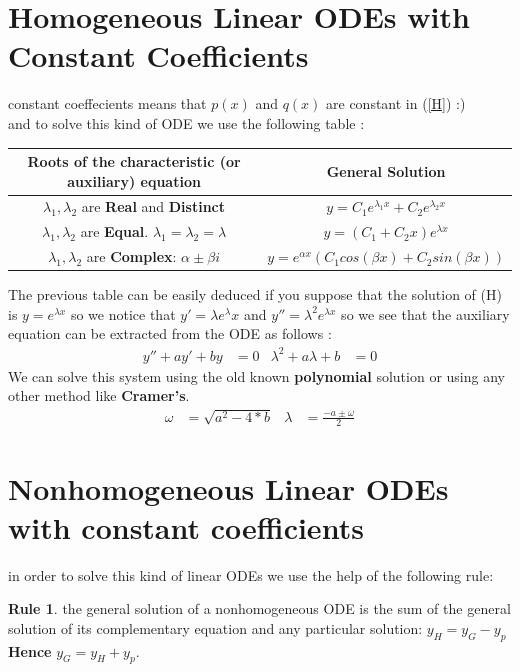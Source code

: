 \documentclass[11pt]{article}
\theoremstyle{definition}
\newtheorem{reg}{Rule}
\begin{document}
\section{Homogeneous Linear ODEs with Constant Coefficients}
constant coeffecients means that $p(x)$ and $q(x)$ are constant in (\ref{H}) :) \\
and to solve this kind of ODE we use the following table :
\begin{center}
    \begin{tabular}{c|c}
       Roots of the \textbf{characteristic (or auxiliary)} equation   & General Solution \\
       \hline
        $\lambda_1, \lambda_2$ are \textbf{Real} and \textbf{Distinct}  & $y = C_1 e^{\lambda_1 x} + C_2 e^{\lambda_2 x}$\\
        \hline
        $\lambda_1, \lambda_2$ are \textbf{Equal}. $\lambda_1 = \lambda_2 =\lambda$ & $y = (C_1 + C_2 x) e^{\lambda x}$  \\
        \hline
        $\lambda_1, \lambda_2$ are \textbf{Complex}: $\alpha \pm \beta i$ & $y=e^{\alpha x} (C_1 cos(\beta x) + C_2 sin(\beta x))$
    \end{tabular}
\end{center}
The previous table can be easily deduced if you suppose that the solution of (H) is $y = e^{\lambda x}$ so we notice that $ y' = \lambda e^ \lambda x $ and $y'' = \lambda^2 e^ {\lambda x}$ so we see that the auxiliary equation can be extracted from the ODE as follows : 
\begin{align*}
    y'' + ay'+by &= 0 &
    \lambda^2 + a\lambda + b&=0 
    \end{align*}
    We can solve this system using the old known \textbf{polynomial} solution or using any other method like \textbf{Cramer's}. 
    \begin{align*}
    \omega &= \sqrt{a^2-4*b} &
    \lambda &= \frac{-a \pm \omega}{2}
    \end{align*}
 \section{Nonhomogeneous Linear ODEs with constant coefficients}
in order to solve this kind of linear ODEs we use the help of the following rule:
\begin{reg}
the general solution of a nonhomogeneous
ODE is the sum of the general solution of its complementary equation and any particular solution: $y_H = y_G - y_p$ \textbf{Hence} $y_G = y_H + y_p$.
\end{reg}
\end{document}
